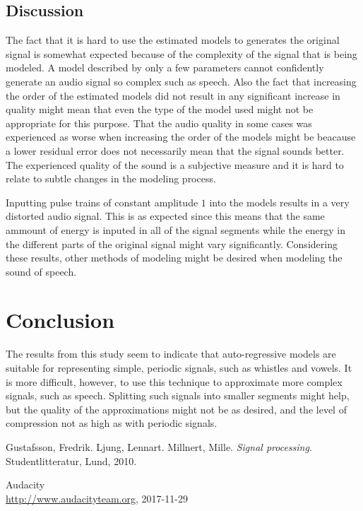 \documentclass{IEEEtran}
\begin{document}
\subsection{Discussion}
The fact that it is hard to use the estimated models to generates the
original signal is somewhat expected because of the complexity of the
signal that is being modeled. A model described by only a few parameters
cannot confidently generate an audio signal so complex such as speech.
Also the fact that increasing the order of the estimated models did not
result in any significant increase in quality might mean that even the
type of the model used might not be appropriate for this purpose. That
the audio quality in some cases was experienced as worse when increasing
the order of the models might be beacause a lower residual error does
not necessarily mean that the signal sounds better. The experienced
quality of the sound is a subjective measure and it is hard to relate
to subtle changes in the modeling process.

Inputting pulse trains of constant amplitude $1$ into the models results
in a very distorted audio signal. This is as expected since this means
that the same ammount of energy is inputed in all of the signal segments
while the energy in the different parts of the original signal might vary
significantly. Considering these results, other methods of modeling might
be desired when modeling the sound of speech.

\section{Conclusion}

The results from this study seem to indicate that auto-regressive models are
suitable for representing simple, periodic signals, such as whistles and
vowels. It is more difficult, however, to use this technique to approximate
more complex signals, such as speech. Splitting such signals into smaller
segments might help, but the quality of the approximations might not be as
desired, and the level of compression not as high as with periodic signals.

\newpage
\begin{thebibliography}{9}

  Gustafsson, Fredrik. Ljung, Lennart. Millnert, Mille.
  \textit{Signal processing}.
  Studentlitteratur, Lund,
  2010.

  Audacity \\
  \url{http://www.audacityteam.org},
  2017-11-29

\end{thebibliography}
\end{document}
